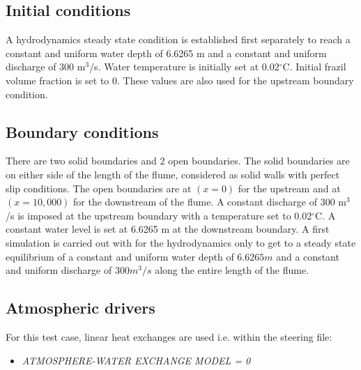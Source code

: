 \subsection{Initial conditions}

A hydrodynamics steady state condition is established first separately to reach a constant and uniform water depth of 6.6265 m and a constant and uniform discharge of 300 m$^3$/s.
Water temperature is initially set at 0.02$^\circ$C. Initial frazil volume fraction is set to $0$. These values are also used for the upstream boundary condition.

\subsection{Boundary conditions}

There are two solid boundaries and 2 open boundaries.
The solid boundaries are on either side of the length of the flume, considered as solid walls with perfect slip conditions.
The open boundaries are at $(x=0)$ for the upstream and at $(x=10,000)$ for the downstream of the flume. A constant discharge of 300 m$^3$/s is imposed at the upstream boundary with a temperature set to 0.02$^{\circ}$C. A constant water level is set at 6.6265 m at the downstream boundary.
A first simulation is carried out with for the hydrodynamics only to get to a steady state equilibrium of a constant and uniform water depth of $6.6265m$ and a constant and uniform discharge of $300m^3/s$ along the entire length of the flume.


\subsection{Atmospheric drivers}

For this test case, linear heat exchanges are used i.e. within the \khione steering file:
\begin{itemize}
	\item\textit{ATMOSPHERE-WATER EXCHANGE MODEL = 0}
\end{itemize}

